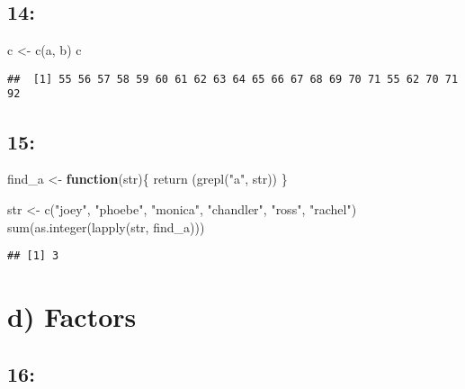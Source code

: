 \documentclass[
]{article}
\newenvironment{Shaded}{\begin{snugshade}}{\end{snugshade}}
\newcommand{\ControlFlowTok}[1]{\textcolor[rgb]{0.13,0.29,0.53}{\textbf{#1}}}
\newcommand{\FunctionTok}[1]{\textcolor[rgb]{0.00,0.00,0.00}{#1}}
\newcommand{\NormalTok}[1]{#1}
\newcommand{\OtherTok}[1]{\textcolor[rgb]{0.56,0.35,0.01}{#1}}
\newcommand{\StringTok}[1]{\textcolor[rgb]{0.31,0.60,0.02}{#1}}
\begin{document}
\hypertarget{section-13}{%
\subsection{14:}\label{section-13}}

\begin{Shaded}
\begin{Highlighting}[]
\NormalTok{c }\OtherTok{\textless{}{-}} \FunctionTok{c}\NormalTok{(a, b)}
\NormalTok{c}
\end{Highlighting}
\end{Shaded}

\begin{verbatim}
##  [1] 55 56 57 58 59 60 61 62 63 64 65 66 67 68 69 70 71 55 62 70 71 92
\end{verbatim}

\hypertarget{section-14}{%
\subsection{15:}\label{section-14}}

\begin{Shaded}
\begin{Highlighting}[]
\NormalTok{find\_a }\OtherTok{\textless{}{-}} \ControlFlowTok{function}\NormalTok{(str)\{}
  \FunctionTok{return}\NormalTok{ (}\FunctionTok{grepl}\NormalTok{(}\StringTok{"a"}\NormalTok{, str))}
\NormalTok{\}}

\NormalTok{str }\OtherTok{\textless{}{-}} \FunctionTok{c}\NormalTok{(}\StringTok{"joey"}\NormalTok{, }\StringTok{"phoebe"}\NormalTok{, }\StringTok{"monica"}\NormalTok{, }\StringTok{"chandler"}\NormalTok{, }\StringTok{"ross"}\NormalTok{, }\StringTok{"rachel"}\NormalTok{)}
\FunctionTok{sum}\NormalTok{(}\FunctionTok{as.integer}\NormalTok{(}\FunctionTok{lapply}\NormalTok{(str, find\_a)))}
\end{Highlighting}
\end{Shaded}

\begin{verbatim}
## [1] 3
\end{verbatim}

\hypertarget{d-factors}{%
\section{d) Factors}\label{d-factors}}

\hypertarget{section-15}{%
\subsection{16:}\label{section-15}}
\end{document}
